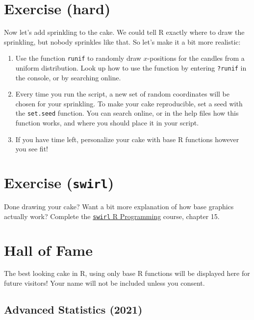 \documentclass[
]{book}
\providecommand{\tightlist}{%
  \setlength{\itemsep}{0pt}\setlength{\parskip}{0pt}}
\begin{document}
\hypertarget{exercise-hard}{%
\section{Exercise (hard)}\label{exercise-hard}}

Now let's add sprinkling to the cake. We could tell R exactly where to draw the sprinkling, but nobody sprinkles like that. So let's make it a bit more realistic:

\begin{enumerate}
\def\labelenumi{\arabic{enumi}.}
\tightlist
\item
  Use the function \texttt{runif} to randomly draw \(x\)-positions for the candles from a uniform distribution. Look up how to use the function by entering \texttt{?runif} in the console, or by searching online.
\item
  Every time you run the script, a new set of random coordinates will be chosen for your sprinkling. To make your cake reproducible, set a seed with the \texttt{set.seed} function. You can search online, or in the help files how this function works, and where you should place it in your script.
\item
  If you have time left, personalize your cake with base R functions however you see fit!
\end{enumerate}

\hypertarget{exercise-swirl}{%
\section{\texorpdfstring{Exercise (\texttt{swirl})}{Exercise (swirl)}}\label{exercise-swirl}}

Done drawing your cake? Want a bit more explanation of how base graphics actually work? Complete the \href{https://youtu.be/eKKil5iyxLM?t=148}{\texttt{swirl} R Programming} course, chapter 15.

\hypertarget{hall-of-fame}{%
\section*{Hall of Fame}\label{hall-of-fame}}

The best looking cake in R, using only base R functions will be displayed here for future visitors! Your name will not be included unless you consent.

\hypertarget{advanced-statistics-2021}{%
\subsection*{Advanced Statistics (2021)}\label{advanced-statistics-2021}}
\end{document}
